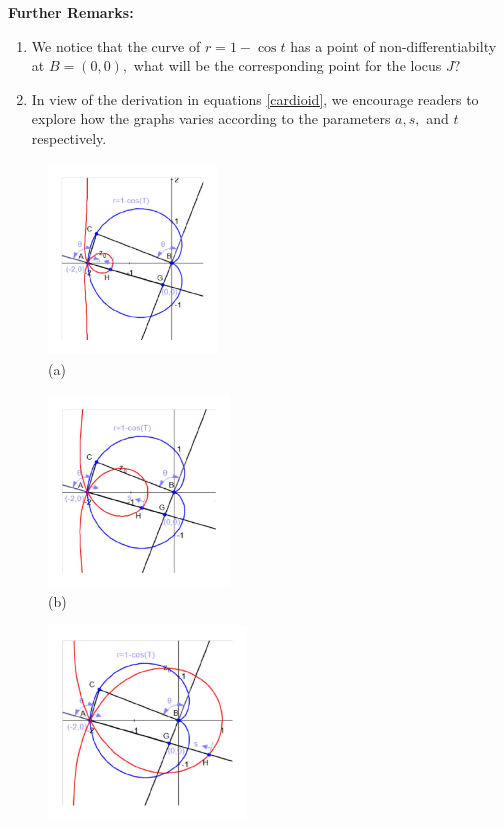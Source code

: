 \documentclass[12pt,a4paper]{article}%
\begin{document}
\textbf{Further Remarks: }

\begin{enumerate}
\item We notice that the curve of $r=1-\cos t$ has a point of
non-differentiabilty at $B=(0,0),$ what will be the corresponding point for
the locus $J?$

\item In view of the derivation in equations \ref{cardioid}, we encourage
readers to explore how the graphs varies according to the parameters $a,s,$
and $t$ respectively.
\end{enumerate}

\begin{figure}[htpb]
\begin{center}
\parbox[b]{1.6826in}{\begin{center}
\includegraphics[natheight=3.960400in,natwidth=3.454800in,height=2.0108in,width=1.7562in]{PJH75I1Q.pdf}
 \\ (a)
\end{center}}
\qquad
\parbox[b]{1.6826in}{\begin{center}
\includegraphics[natheight=3.881400in,natwidth=3.639300in,height=2.0197in,width=1.8928in]{PJH75I1R.pdf}
 \\ (b)
\end{center}}
\qquad
\parbox[b]{1.6826in}{\begin{center}
\includegraphics[natheight=3.831800in,natwidth=3.946200in,height=2.0214in,width=2.0817in]{PJH75I1S.pdf}

\end{center}}
\end{center}
\end{figure}
\end{document}

